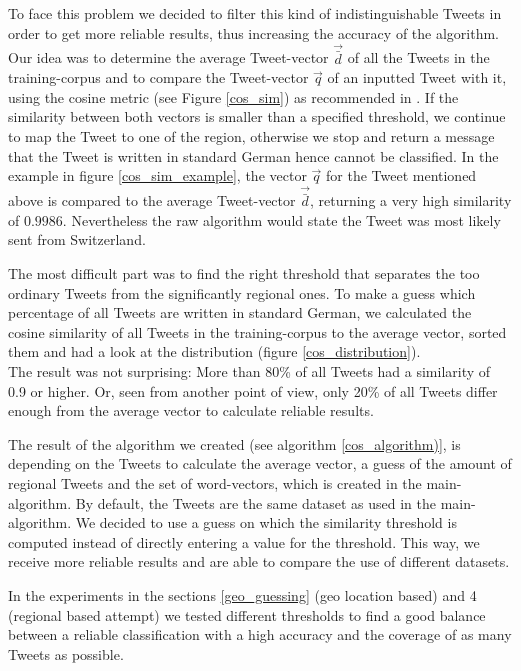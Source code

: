 \documentclass[../Main.tex]{subfiles}
\begin{document}
To face this problem we decided to filter this kind of indistinguishable Tweets in order to get more reliable results, thus increasing the accuracy of the algorithm. \\
Our idea was to determine the average Tweet-vector $\vec{\bar{d}}$ of all the Tweets in the training-corpus and to compare the Tweet-vector $\vec{q}$ of an inputted Tweet with it, using the cosine metric (see Figure \ref{cos_sim}) as recommended in \cite[805]{SaLP}. If the similarity between both vectors is smaller than a specified threshold, we continue to map the Tweet to one of the region, otherwise we stop and return a message that the Tweet is written in standard German hence cannot be classified. In the example in figure \ref{cos_sim_example}, the vector $\vec{q}$ for the Tweet mentioned above is compared to the average Tweet-vector $\vec{\bar{d}}$, returning a very high similarity of $0.9986$. Nevertheless the raw algorithm would state the Tweet was most likely sent from Switzerland.

The most difficult part was to find the right threshold that separates the too ordinary Tweets from the significantly regional ones. To make a guess which percentage of all Tweets are written in standard German, we calculated the cosine similarity of all Tweets in the training-corpus to the average vector, sorted them and had a look at the distribution (figure \ref{cos_distribution}). \\
The result was not surprising: More than 80\% of all Tweets had a similarity of 0.9 or higher. Or, seen from another point of view, only 20\% of all Tweets differ enough from the average vector to calculate reliable results.

The result of  the algorithm we created (see algorithm \ref{cos_algorithm)}, is depending on the Tweets to calculate the average vector, a guess of the amount of regional Tweets and the set of word-vectors,  which is created in the main-algorithm. By default, the Tweets are the same dataset as used in the main-algorithm. We decided to use a guess on which the similarity threshold is computed instead of directly entering a value for the threshold. This way, we receive more reliable results and are able to compare the use of different datasets.

In the experiments in the sections \ref{geo_guessing} (geo location based) and 4 (regional based attempt) we tested different thresholds to find a good balance between a reliable classification with a high accuracy and the coverage of as many Tweets as possible.
\end{document}
